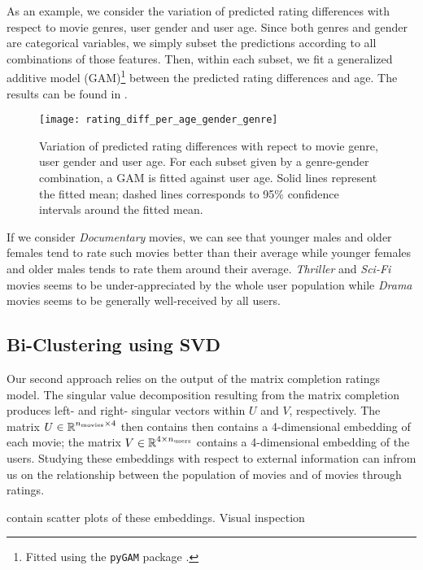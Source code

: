 \documentclass[bj, preprint]{imsart}
\begin{document}
As an example, we consider the variation of predicted rating differences with respect to movie genres, user gender and user age. Since both genres and gender are categorical variables, we simply subset the predictions according to all combinations of those features. Then, within each subset, we fit a generalized additive model (GAM)\footnote{Fitted using the \texttt{pyGAM} package \citep{pygam}.} between the predicted rating differences and age. The results can be found in .

\begin{figure}
    \centering
	\texttt{[image: rating\_diff\_per\_age\_gender\_genre]}
	\caption{Variation of predicted rating differences with repect to movie genre, user gender and user age. For each subset given by a genre-gender combination, a GAM is fitted against user age. Solid lines represent the fitted mean; dashed lines corresponds to 95\% confidence intervals around the fitted mean.\label{fig:explore.corr.gam}}
\end{figure}

If we consider \textit{Documentary} movies, we can see that younger males and older females tend to rate such movies better than their average while younger females and older males tends to rate them around their average. \textit{Thriller} and \textit{Sci-Fi} movies seems to be under-appreciated by the whole user population while \textit{Drama} movies seems to be generally well-received by all users.

\subsection{Bi-Clustering using SVD}\label{subsec:explore.cluster}

Our second approach relies on the output of the matrix completion ratings model. The singular value decomposition resulting from the matrix completion produces left- and right- singular vectors within $U$ and $V$, respectively. The matrix $U\in\operatorname{\mathbb R}^{n_{\text{movies}}\times 4}$ then contains then contains a 4-dimensional embedding of each movie; the matrix $V\in\operatorname{\mathbb R}^{4\times n_{\text{users}}}$ contains a 4-dimensional embedding of the users. Studying these embeddings with respect to external information can infrom us on the relationship between the population of movies and of movies through ratings.

 contain scatter plots of these embeddings. Visual inspection 
\end{document}
